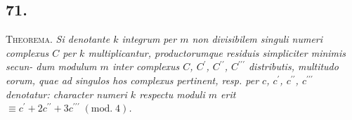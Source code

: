 \documentclass[twoside,12pt, showframe]{memoir}
\renewcommand{\pmod}[1]{\;(\textrm{mod.}\;#1)}
\begin{document}
\subsection*{71.}
 
\textsc{Theorema.} \textit{Si denotante \(k\) integrum per \(m\) non divisibilem singuli numeri complexus \(C\) per \(k\) multiplicantur, productorumque residuis simpliciter minimis secun-\clearpage\noindent%
dum modulum \(m\) inter complexus \(C\), \( C^{\prime}\), \( C^{\prime \prime}\), \( C^{\prime \prime \prime}\) distributis, multitudo eorum, quae ad singulos hos complexus pertinent, resp. per \(c\), \( c^{\prime}\), \( c^{\prime \prime}\), \( c^{\prime \prime \prime}\) denotatur: character numeri \(k\) respectu moduli \(m\) erit \(\equiv c^{\prime}+2 c^{\prime \prime}+3 c^{\prime \prime \prime}\pmod{4}\).}
\end{document}
